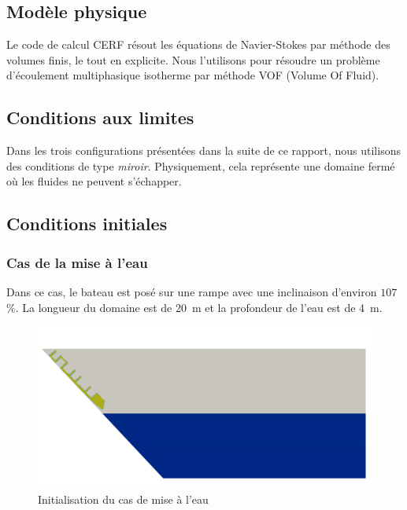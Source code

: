 \documentclass[../main.tex]{subfiles}
\begin{document}
\subsection{Modèle physique}

Le code de calcul CERF résout les équations de Navier-Stokes par méthode des volumes finis, le tout en explicite.
Nous l'utilisons pour résoudre un problème d'écoulement multiphasique isotherme par méthode VOF (Volume Of Fluid).



\subsection{Conditions aux limites}

Dans les trois configurations présentées dans la suite de ce rapport, nous utilisons des conditions de type \textit{miroir}.
Physiquement, cela représente une domaine fermé où les fluides ne peuvent s'échapper.





\subsection{Conditions initiales}


\subsubsection{Cas de la mise à l'eau}

Dans ce cas, le bateau est posé sur une rampe avec une inclinaison d'environ $107$ \%. La longueur du domaine est de \qty{20}{m} et la profondeur de l'eau est de \qty{4}{m}.

\begin{figure}[H]
    \centering
    \includegraphics[width=12cm]{IMAGES/part1/Init_zephyr_launching.png}
    \caption{Initialisation du cas de mise à l'eau}
\end{figure}
\end{document}
